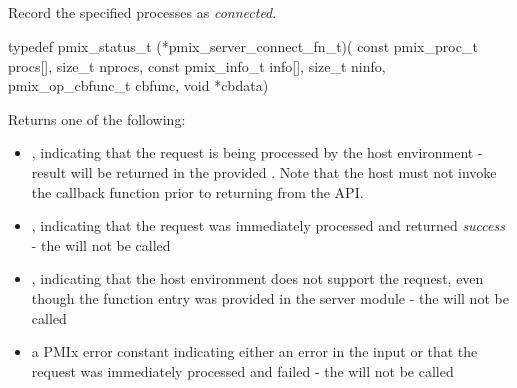 \subsection{}

\summary

Record the specified processes as \textit{connected}.

\format

\cspecificstart
\begin{codepar}
typedef pmix_status_t (*pmix_server_connect_fn_t)(
                             const pmix_proc_t procs[],
                             size_t nprocs,
                             const pmix_info_t info[],
                             size_t ninfo,
                             pmix_op_cbfunc_t cbfunc,
                             void *cbdata)
\end{codepar}
\cspecificend

\begin{arglist}
\end{arglist}

Returns one of the following:

\begin{itemize}
    \item {}, indicating that the request is being processed by the host environment - result will be returned in the provided . Note that the host must not invoke the callback function prior to returning from the \ac{API}.
    \item {}, indicating that the request was immediately processed and returned \textit{success} - the  will not be called
    \item {}, indicating that the host environment does not support the request, even though the function entry was provided in the server module - the  will not be called
    \item a PMIx error constant indicating either an error in the input or that the request was immediately processed and failed - the  will not be called
\end{itemize}

